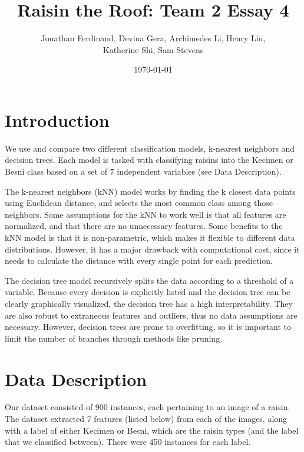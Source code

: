 \documentclass{article}
\title{Raisin the Roof: Team 2 Essay 4}
\author{Jonathan Ferdinand, Devina Gera, Archimedes Li, Henry Liu, \\Katherine Shi, Sam Stevens}
\date{\today}
\begin{document}
\maketitle

\section{Introduction}

We use and compare two different classification models, k-nearest neighbors and decision trees.  Each model is tasked with classifying raisins into the Kecimen or Besni class based on a set of 7 independent variables (see Data Description).

The k-nearest neighbors (kNN) model works by finding the k closest data points using Euclidean distance, and selects the most common class among those neighbors.  Some assumptions for the kNN to work well is that all features are normalized, and that there are no unnecessary features.  Some benefits to the kNN model is that it is non-parametric, which makes it flexible to different data distributions.  However, it has a major drawback with computational cost, since it needs to calculate the distance with every single point for each prediction.

The decision tree model recursively splits the data according to a threshold of a variable.  Because every decision is explicitly listed and the decision tree can be clearly graphically visualized, the decision tree has a high interpretability.  They are also robust to extraneous features and outliers, thus no data assumptions are necessary.  However, decision trees are prone to overfitting, so it is important to limit the number of branches through methods like pruning.


\section{Data Description}
Our dataset consisted of 900 instances, each pertaining to an image of a raisin. The dataset extracted 7 features (listed below) from each of the images, along with a label of either Kecimen or Besni, which are the raisin types (and the label that we classified between). There were 450 instances for each label.
\end{document}

